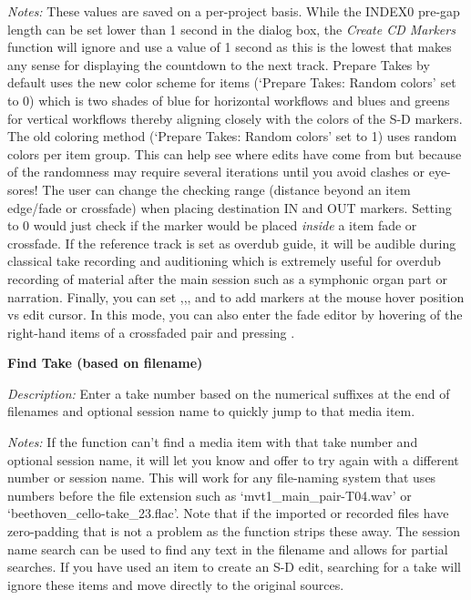 \documentclass[10pt,american]{article}
\begin{document}
\emph{Notes: }These values are saved on a per-project basis. While the INDEX0
pre-gap length can be set lower than 1 second in the dialog box, the
\emph{Create CD Markers}  function will ignore and use a value of 1
second as this is the lowest that makes any sense for displaying the countdown
to the next track. Prepare Takes by default uses the new color scheme for items
(`Prepare Takes: Random colors' set to 0) which is two shades of blue for
horizontal workflows and blues and greens for vertical workflows thereby
aligning closely with the colors of the S-D markers. The old coloring method
(`Prepare Takes: Random colors' set to 1) uses random colors per item group.
This can help see where edits have come from but because of the randomness may
require several iterations until you avoid clashes or eye-sores! The user can
change the checking range (distance beyond an item edge/fade or crossfade) when
placing destination IN and OUT markers. Setting to 0 would just check if the
marker would be placed \emph{inside} a item fade or crossfade. If the reference
track is set as overdub guide, it will be audible during classical take
recording and auditioning which is extremely useful for overdub recording of
material after the main session such as a symphonic organ part or narration.
Finally, you can set ,,, and  to add markers at
the mouse hover position vs edit cursor. In this mode, you can also enter the
fade editor by hovering of the right-hand items of a crossfaded pair and
pressing .

\textbf{Find Take (based on filename) }\keys{\return}

\emph{Description: }Enter a take number based on the numerical suffixes at the
end of filenames and optional session name to quickly jump to that media item. 

\emph{Notes: }If the function can't find a media item with that take number and
optional session name, it will let you know and offer to try again with a
different number or session name. This will work for any file-naming system that
uses numbers before the file extension such as `mvt1\_main\_pair-T04.wav' or
`beethoven\_cello-take\_23.flac'. Note that if the imported or recorded files
have zero-padding that is not a problem as the function strips these away. The
session name search can be used to find any text in the filename and allows for
partial searches. If you have used an item to create an S-D edit, searching for
a take will ignore these items and move directly to the original sources.
\end{document}
